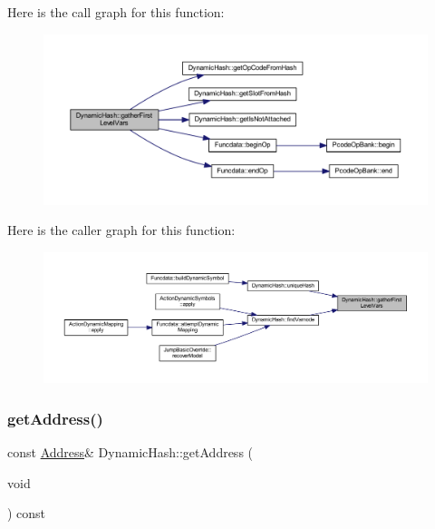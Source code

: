 Here is the call graph for this function\+:
\nopagebreak
\begin{figure}[H]
\begin{center}
\leavevmode
\includegraphics[width=350pt]{class_dynamic_hash_a31d945277695dda3a0931fd29ee95234_cgraph}
\end{center}
\end{figure}
Here is the caller graph for this function\+:
\nopagebreak
\begin{figure}[H]
\begin{center}
\leavevmode
\includegraphics[width=350pt]{class_dynamic_hash_a31d945277695dda3a0931fd29ee95234_icgraph}
\end{center}
\end{figure}
\mbox{\label{class_dynamic_hash_a304ee882e7ad7f4edd33bda810622cb2}} 
\subsubsection{\texorpdfstring{getAddress()}{getAddress()}}
{\footnotesize\ttfamily const \mbox{\hyperlink{class_address}{Address}}\& Dynamic\+Hash\+::get\+Address (\begin{DoxyParamCaption}\item[{void}]{ }\end{DoxyParamCaption}) const\hspace{0.3cm}{\ttfamily [inline]}}



